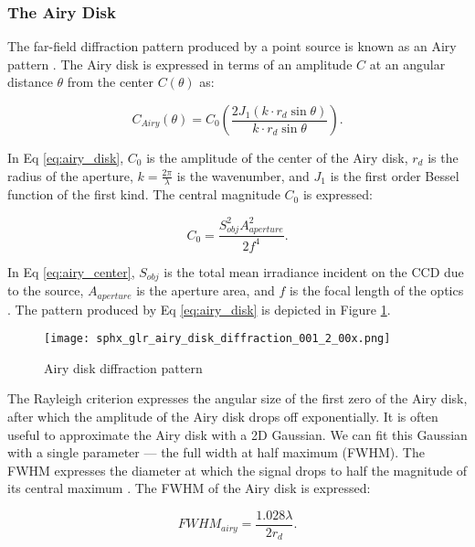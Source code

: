 \subsubsection{The Airy Disk}

The far-field diffraction pattern produced by a point source is known as an Airy pattern \cite{frueh2019notes}. The Airy disk is expressed in terms of an amplitude $C$ at an angular distance $\theta$ from the center $C(\theta)$ as:

\begin{equation} \label{eq:airy_disk}
  C_{Airy}(\theta) = C_0 \left( \frac{2 J_1(k \cdot r_d \sin\theta)}{k \cdot r_d \sin\theta} \right).
\end{equation}

In Eq \ref{eq:airy_disk}, $C_0$ is the amplitude of the center of the Airy disk, $r_d$ is the radius of the aperture, $k = \frac{2\pi}{\lambda}$ is the wavenumber, and $J_1$ is the first order Bessel function of the first kind. The central magnitude $C_0$ is expressed:

\begin{equation} \label{eq:airy_center}
  C_0 = \frac{S_{obj}^2 A_{aperture}^2}{2 f^4}.
\end{equation}

In Eq \ref{eq:airy_center}, $S_{obj}$ is the total mean irradiance incident on the CCD due to the source, $A_{aperture}$ is the aperture area, and $f$ is the focal length of the optics \cite{frueh2019notes}. The pattern produced by Eq \ref{eq:airy_disk} is depicted in Figure \ref{fig:airy_disk_magnitude}.

\begin{figure}[ht]
  \centering
  \texttt{[image: sphx\_glr\_airy\_disk\_diffraction\_001\_2\_00x.png]}
  \caption{Airy disk diffraction pattern}
  \label{fig:airy_disk_magnitude}
\end{figure}

The Rayleigh criterion expresses the angular size of the first zero of the Airy disk, after which the amplitude of the Airy disk drops off exponentially. It is often useful to approximate the Airy disk with a 2D Gaussian. We can fit this Gaussian with a single parameter --- the full width at half maximum (FWHM). The FWHM expresses the diameter at which the signal drops to half the magnitude of its central maximum \cite{frueh2019notes}. The FWHM of the Airy disk is expressed:

\begin{equation} \label{eq:fwhm_airy}
  FWHM_{airy} = \frac{1.028 \lambda}{2 r_d}.
\end{equation}

